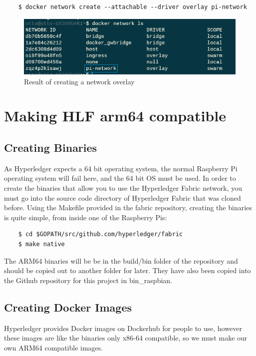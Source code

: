 \begin{verbatim}
    $ docker network create --attachable --driver overlay pi-network
\end{verbatim}

\begin{figure}[h]
    \centering
    \includegraphics{images/networkoverlay.png}
    \caption{Result of creating a network overlay}
    \label{fig:my_label}
\end{figure}

\section{Making HLF arm64 compatible}


\subsection{Creating Binaries}

As Hyperledger expects a 64 bit operating system, the normal Raspberry Pi operating system will fail here, and the 64 bit OS must be used. 
In order to create the binaries that allow you to use the Hyperledger Fabric network, you must go into the source code directory of Hyperledger Fabric that was cloned before. 
Using the Makefile provided in the fabric repository, creating the binaries is quite simple, from inside one of the Raspberry Pis:
\begin{verbatim}
    $ cd $GOPATH/src/github.com/hyperledger/fabric
    $ make native
\end{verbatim}



The ARM64 binaries will be be in the build/bin folder of the repository and should be copied out to another folder for later. They have also been copied into the Github repository for this project in bin\_raspbian.


\subsection{Creating Docker Images}

Hyperledger provides Docker images on Dockerhub for people to use, however these images are like the binaries only x86-64 compatible, so we must make our own ARM64 compatible images.

